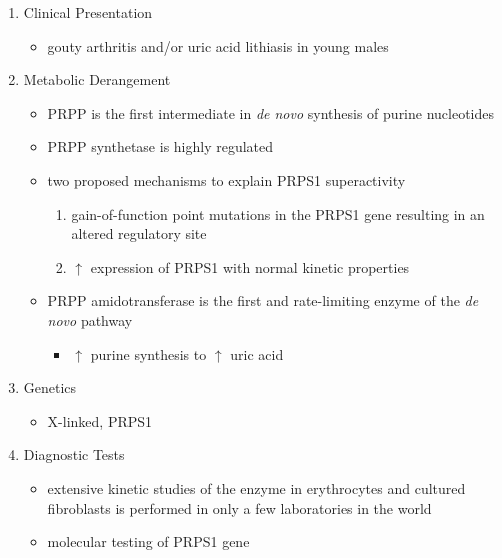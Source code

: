 \documentclass{scrartcl}
\begin{document}
\begin{enumerate}
\item Clinical Presentation
\label{sec:org243e27b}
\begin{itemize}
\item gouty arthritis and/or uric acid lithiasis in young males
\end{itemize}

\item Metabolic Derangement
\label{sec:orgc51d8a6}
\begin{itemize}
\item PRPP is the first intermediate in \emph{de novo} synthesis of purine nucleotides
\end{itemize}
\begin{itemize}
\item PRPP synthetase is highly regulated
\item two proposed mechanisms to explain PRPS1 superactivity
\begin{enumerate}
\item gain-of-function point mutations in the PRPS1 gene resulting in an
altered regulatory site
\item \(\uparrow\) expression of PRPS1 with normal kinetic properties
\end{enumerate}
\item PRPP amidotransferase is the first and rate-limiting enzyme of the
\emph{de novo} pathway
\begin{itemize}
\item \(\uparrow\) purine synthesis to \(\uparrow\) uric acid
\end{itemize}
\end{itemize}

\item Genetics
\label{sec:org99a4e12}
\begin{itemize}
\item X-linked, PRPS1
\end{itemize}

\item Diagnostic Tests
\label{sec:orgff94658}
\begin{itemize}
\item extensive kinetic studies of the enzyme in erythrocytes and cultured
fibroblasts is performed in only a few laboratories in the world
\item molecular testing of PRPS1 gene
\end{itemize}


\end{enumerate}
\end{document}
